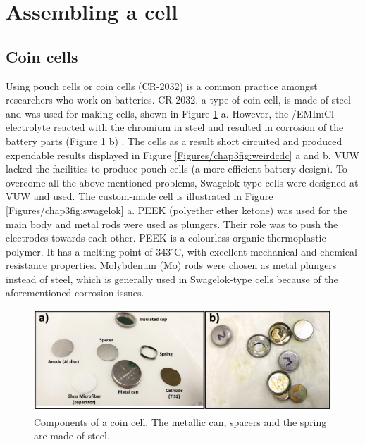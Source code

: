 \section{Assembling a cell}

\subsection*{Coin cells}
Using pouch cells or coin cells (CR-2032\textregistered) is a common practice amongst researchers who work on batteries. CR-2032, a type of coin cell, is made of steel and was used for making cells, shown in Figure \ref{Figures/chap3fig:concell} a. However, the /EMImCl electrolyte reacted with the chromium in steel and resulted in corrosion of the battery parts (Figure \ref{Figures/chap3fig:concell} b) \cite{das_aluminium-ion_2017}. The cells as a result short circuited and produced expendable results displayed in Figure \ref{Figures/chap3fig:weirdcdc} a and b. VUW lacked the facilities to produce pouch cells (a more efficient battery design). To overcome all the above-mentioned problems, Swagelok-type cells were designed at VUW and used. The custom-made cell is illustrated in Figure \ref{Figures/chap3fig:swagelok} a. PEEK (polyether ether ketone) was used for the main body and metal rods were used as plungers. Their role was to push the electrodes towards each other. PEEK is a colourless organic thermoplastic polymer. It has a melting point of 343$^{\circ}$C, with excellent mechanical and chemical resistance properties. Molybdenum (Mo) rods were chosen as metal plungers instead of steel, which is generally used in Swagelok-type cells because of the aforementioned corrosion issues. 

\begin{figure}[tbh!]
\centering
\includegraphics[width=\textwidth]{Figures/chap3fig/concell.pdf}
\caption{Components of a coin cell. The metallic can, spacers and the spring are made of steel.}
\label{Figures/chap3fig:concell}
\end{figure}

